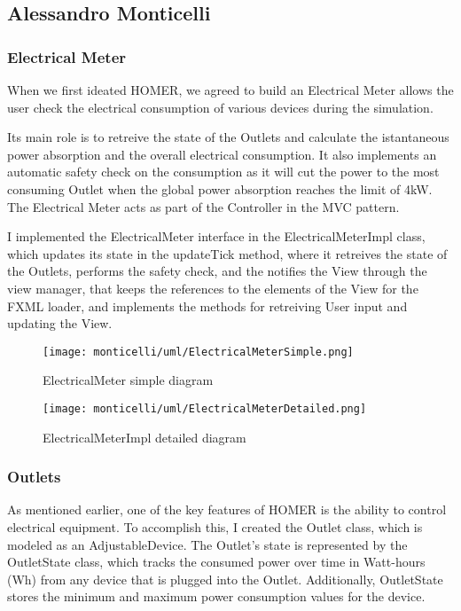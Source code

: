 \subsection{Alessandro Monticelli}
\subsubsection*{Electrical Meter}
When we first ideated HOMER, we agreed to build an Electrical Meter allows the user check the electrical consumption of various devices during the simulation.

Its main role is to retreive the state of the Outlets and calculate the istantaneous power absorption and the overall electrical consumption.
It also implements an automatic safety check on the consumption as it will cut the power to the most consuming Outlet when the global power absorption reaches the limit of 4kW.
The Electrical Meter acts as part of the Controller in the MVC pattern. 

I implemented the ElectricalMeter interface in the ElectricalMeterImpl class, which updates its state in the updateTick method, where it retreives the state of the Outlets, 
performs the safety check, and the notifies the View through the view manager, that keeps the references to the elements of the View for the FXML loader, 
and implements the methods for retreiving User input and updating the View.

\begin{figure}[H]
    \centering{}
    \texttt{[image: monticelli/uml/ElectricalMeterSimple.png]}
    \caption{ElectricalMeter simple diagram}
    \label{monticelli:uml:simpleMeter}
\end{figure}

\begin{figure}[H]
    \centering{}
    \texttt{[image: monticelli/uml/ElectricalMeterDetailed.png]}
    \caption{ElectricalMeterImpl detailed diagram}
    \label{monticelli:uml:detailedMeter}
\end{figure}

\subsubsection{Outlets}
As mentioned earlier, one of the key features of HOMER is the ability to control electrical equipment. \newline
To accomplish this, I created the Outlet class, which is modeled as an AdjustableDevice. \newline
The Outlet's state is represented by the OutletState class, which tracks the consumed power over time in Watt-hours (Wh) 
from any device that is plugged into the Outlet. Additionally, OutletState stores the minimum and maximum power consumption 
values for the device. \newline


